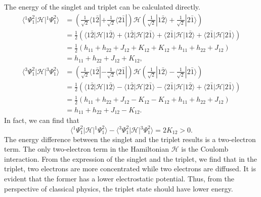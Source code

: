 \documentclass[a4paper]{book}
\newcounter{solution}[chapter]
\begin{document}
	\begin{solution}
	
	The energy of the singlet and triplet can be calculated directly.
	\begin{align*}
		\langle {}^1 \Psi^2_1 | \mathscr{H} | {}^1 \Psi^2_1 \rangle &= \left( \frac{1}{ \sqrt{2} } \langle 1 \bar{2} | + \frac{1}{ \sqrt{2} } \langle 2 \bar{1} | \right) \mathscr{H} \left( \frac{1}{ \sqrt{2} } | 1 \bar{2} \rangle + \frac{1}{ \sqrt{2} } | 2 \bar{1} \rangle \right) \\
		&= \frac{1}{2} \left( \langle 1 \bar{2} | \mathscr{H} | 1 \bar{2} \rangle + \langle 1 \bar{2} | \mathscr{H} | 2 \bar{1} \rangle + \langle 2 \bar{1} | \mathscr{H} | 1 \bar{2} \rangle + \langle 2 \bar{1} | \mathscr{H} | 2 \bar{1} \rangle \right) \\
		&= \frac{1}{2} \left( h_{11} + h_{22} + J_{12} + K_{12} + K_{12} + h_{11} + h_{22} + J_{12} \right) \\
		&= h_{11} + h_{22} + J_{12} + K_{12} , \\
		\langle {}^3 \Psi^2_1 | \mathscr{H} | {}^3 \Psi^2_1 \rangle &= \left( \frac{1}{ \sqrt{2} } \langle 1 \bar{2} | - \frac{1}{ \sqrt{2} } \langle 2 \bar{1} | \right) \mathscr{H} \left( \frac{1}{ \sqrt{2} } | 1 \bar{2} \rangle - \frac{1}{ \sqrt{2} } | 2 \bar{1} \rangle \right) \\
		&= \frac{1}{2} \left( \langle 1 \bar{2} | \mathscr{H} | 1 \bar{2} \rangle - \langle 1 \bar{2} | \mathscr{H} | 2 \bar{1} \rangle - \langle 2 \bar{1} | \mathscr{H} | 1 \bar{2} \rangle + \langle 2 \bar{1} | \mathscr{H} | 2 \bar{1} \rangle \right) \\
		&= \frac{1}{2} \left( h_{11} + h_{22} + J_{12} - K_{12} - K_{12} + h_{11} + h_{22} + J_{12} \right) \\
		&= h_{11} + h_{22} + J_{12} - K_{12} .
	\end{align*}
	In fact, we can find that
	\[
		\langle {}^1 \Psi^2_1 | \mathscr{H} | {}^1 \Psi^2_1 \rangle - \langle {}^3 \Psi^2_1 | \mathscr{H} | {}^3 \Psi^2_1 \rangle = 2 K_{12} > 0 .
	\]
	The energy difference between the singlet and the triplet results is a two-electron term. The only two-electron term in the Hamiltonian $\mathscr{H}$ is the Coulomb interaction. From the expression of the singlet and the triplet, we find that in the triplet, two electrons are more concentrated while two electrons are diffused. It is evident that the former has a lower electrostatic potential. Thus, from the perspective of classical physics, the triplet state should have lower energy.
	
	\end{solution}
	
\end{document}

